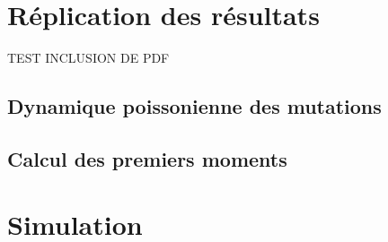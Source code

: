 \documentclass[12pt]{article}
\begin{document}
\newpage

\appendix

\section{Réplication des résultats}
TEST INCLUSION DE PDF

%

\subsection{Dynamique poissonienne des mutations}

\subsection{Calcul des premiers moments}


\newpage

\section{Simulation}
\end{document}
